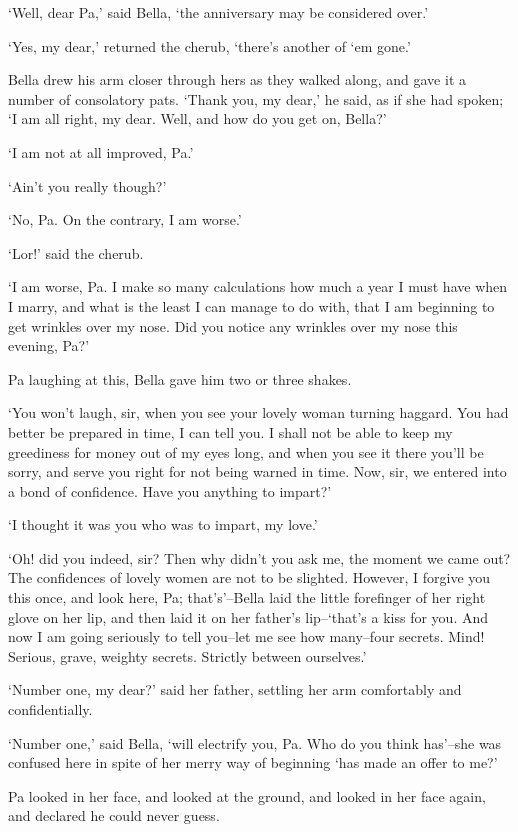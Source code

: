 ‘Well, dear Pa,’ said Bella, ‘the anniversary may be considered over.’

‘Yes, my dear,’ returned the cherub, ‘there’s another of ‘em gone.’

Bella drew his arm closer through hers as they walked along, and gave it
a number of consolatory pats. ‘Thank you, my dear,’ he said, as if
she had spoken; ‘I am all right, my dear. Well, and how do you get on,
Bella?’

‘I am not at all improved, Pa.’

‘Ain’t you really though?’

‘No, Pa. On the contrary, I am worse.’

‘Lor!’ said the cherub.

‘I am worse, Pa. I make so many calculations how much a year I must have
when I marry, and what is the least I can manage to do with, that I am
beginning to get wrinkles over my nose. Did you notice any wrinkles over
my nose this evening, Pa?’

Pa laughing at this, Bella gave him two or three shakes.

‘You won’t laugh, sir, when you see your lovely woman turning haggard.
You had better be prepared in time, I can tell you. I shall not be able
to keep my greediness for money out of my eyes long, and when you see it
there you’ll be sorry, and serve you right for not being warned in time.
Now, sir, we entered into a bond of confidence. Have you anything to
impart?’

‘I thought it was you who was to impart, my love.’

‘Oh! did you indeed, sir? Then why didn’t you ask me, the moment we came
out? The confidences of lovely women are not to be slighted. However, I
forgive you this once, and look here, Pa; that’s’--Bella laid the
little forefinger of her right glove on her lip, and then laid it on her
father’s lip--‘that’s a kiss for you. And now I am going seriously
to tell you--let me see how many--four secrets. Mind! Serious, grave,
weighty secrets. Strictly between ourselves.’

‘Number one, my dear?’ said her father, settling her arm comfortably and
confidentially.

‘Number one,’ said Bella, ‘will electrify you, Pa. Who do you think
has’--she was confused here in spite of her merry way of beginning ‘has
made an offer to me?’

Pa looked in her face, and looked at the ground, and looked in her face
again, and declared he could never guess.

